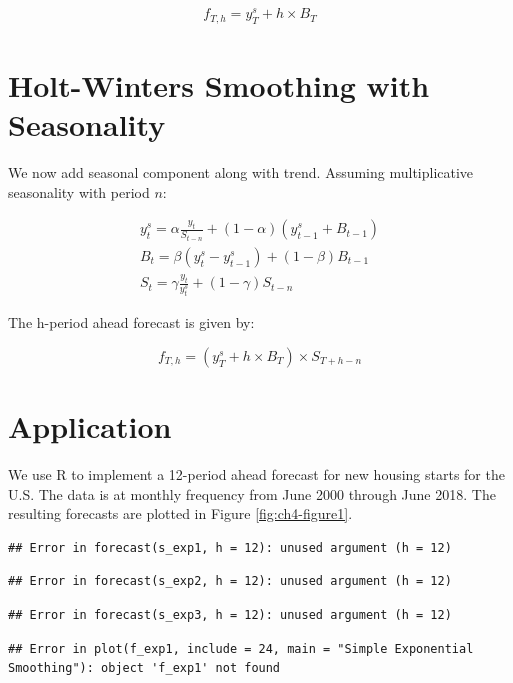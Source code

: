 \documentclass[]{book}
\theoremstyle{definition}
\theoremstyle{definition}
\theoremstyle{definition}
\theoremstyle{remark}
\begin{document}
\begin{align}
  f_{T,h} = y_T^s + h\times B_T
  \end{align}

\hypertarget{holt-winters-smoothing-with-seasonality}{%
\section{Holt-Winters Smoothing with
Seasonality}\label{holt-winters-smoothing-with-seasonality}}

We now add seasonal component along with trend. Assuming multiplicative
seasonality with period \(n\):

\begin{align}
    y_{t}^{s}= \alpha \frac{y_t}{S_{t-n}} + (1-\alpha)(y_{t-1}^{s}+B_{t-1})\\
    B_t = \beta (y_t^s -y_{t-1}^s) + (1-\beta) B_{t-1}\\
    S_t = \gamma\frac{y_t}{y_t^s}+(1-\gamma)S_{t-n}
  \end{align}

The h-period ahead forecast is given by:

\begin{equation}
    f_{T,h}= (y_T^s + h\times B_T) \times S_{T+h-n}
   \end{equation}

\hypertarget{application}{%
\section{Application}\label{application}}

We use R to implement a 12-period ahead forecast for new housing starts
for the U.S. The data is at monthly frequency from June 2000 through
June 2018. The resulting forecasts are plotted in Figure
\ref{fig:ch4-figure1}.

\begin{verbatim}
## Error in forecast(s_exp1, h = 12): unused argument (h = 12)
\end{verbatim}

\begin{verbatim}
## Error in forecast(s_exp2, h = 12): unused argument (h = 12)
\end{verbatim}

\begin{verbatim}
## Error in forecast(s_exp3, h = 12): unused argument (h = 12)
\end{verbatim}

\begin{verbatim}
## Error in plot(f_exp1, include = 24, main = "Simple Exponential Smoothing"): object 'f_exp1' not found
\end{verbatim}
\end{document}
